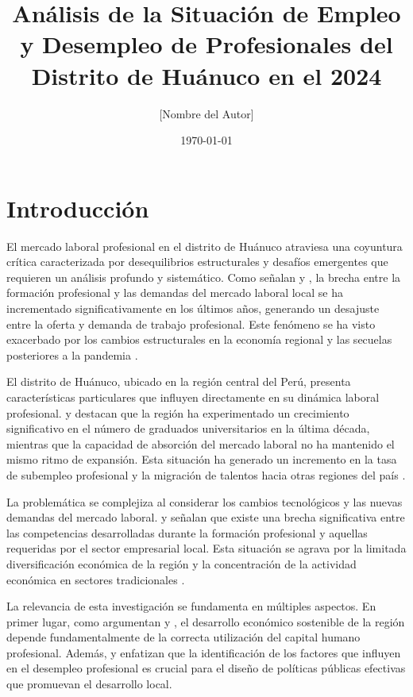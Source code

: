 \documentclass[12pt,a4paper]{article}
\title{Análisis de la Situación de Empleo y Desempleo de Profesionales del Distrito de Huánuco en el 2024}
\author{[Nombre del Autor]}
\date{\today}
\begin{document}
\maketitle

\section{Introducción}

El mercado laboral profesional en el distrito de Huánuco atraviesa una coyuntura crítica caracterizada por desequilibrios estructurales y desafíos emergentes que requieren un análisis profundo y sistemático. Como señalan \cite{torres2023mercado} y \cite{ramirez2023empleo}, la brecha entre la formación profesional y las demandas del mercado laboral local se ha incrementado significativamente en los últimos años, generando un desajuste entre la oferta y demanda de trabajo profesional. Este fenómeno se ha visto exacerbado por los cambios estructurales en la economía regional y las secuelas posteriores a la pandemia \citep{garcia2024analisis, mendoza2023impacto}.

El distrito de Huánuco, ubicado en la región central del Perú, presenta características particulares que influyen directamente en su dinámica laboral profesional. \cite{ortiz2024dinamica} y \cite{wong2023analisis} destacan que la región ha experimentado un crecimiento significativo en el número de graduados universitarios en la última década, mientras que la capacidad de absorción del mercado laboral no ha mantenido el mismo ritmo de expansión. Esta situación ha generado un incremento en la tasa de subempleo profesional y la migración de talentos hacia otras regiones del país \citep{castro2024migracion, durand2023tendencias}.

La problemática se complejiza al considerar los cambios tecnológicos y las nuevas demandas del mercado laboral. \cite{vargas2024transformacion} y \cite{pinto2023competencias} señalan que existe una brecha significativa entre las competencias desarrolladas durante la formación profesional y aquellas requeridas por el sector empresarial local. Esta situación se agrava por la limitada diversificación económica de la región y la concentración de la actividad económica en sectores tradicionales \citep{morales2024estructura, jimenez2023desarrollo}.

La relevancia de esta investigación se fundamenta en múltiples aspectos. En primer lugar, como argumentan \cite{lopez2024desarrollo} y \cite{vasquez2023economia}, el desarrollo económico sostenible de la región depende fundamentalmente de la correcta utilización del capital humano profesional. Además, \cite{silva2024perspectivas} y \cite{rodriguez2023transformacion} enfatizan que la identificación de los factores que influyen en el desempleo profesional es crucial para el diseño de políticas públicas efectivas que promuevan el desarrollo local.
\end{document}
